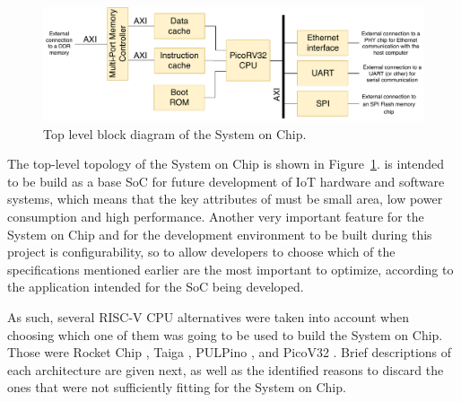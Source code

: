\begin{figure}[!h]
\centering
\includegraphics[width=1\linewidth]{Figures/soc2}
\caption{Top level block diagram of the \socname System on Chip.}
\label{fig:soc}
\end{figure}

The top-level topology of the \socname System on Chip is shown in
Figure~\ref{fig:soc}. \socname is intended to be build as a base SoC for future
development of IoT hardware and software systems, which means that the key
attributes of \socname must be small area, low power consumption and high
performance. Another very important feature for the \socname System on Chip and
for the development environment to be built during this project is
configurability, so to allow developers to choose which of the specifications
mentioned earlier are the most important to optimize, according to the
application intended for the SoC being developed.

As such, several RISC-V CPU alternatives were taken into account when choosing
which one of them was going to be used to build the \socname System on
Chip. Those were Rocket Chip \cite{bib:rocketchip}, Taiga \cite{bib:taiga},
PULPino \cite{bib:pulpino}, and PicoV32 \cite{bib:picorv32}. Brief descriptions
of each architecture are given next, as well as the identified reasons to
discard the ones that were not sufficiently fitting for the \socname System on
Chip.

